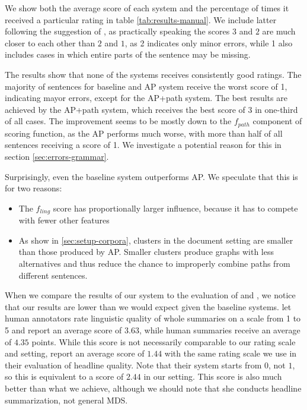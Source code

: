 \documentclass[a4paper,BCOR=10mm]{report}
\numberwithin{lemma}{chapter}
\numberwithin{definition}{chapter}
\begin{document}
We show both the average score of each system and the percentage of times it received a particular rating in table \ref{tab:results-manual}.
We include latter following the suggestion of \citet{filippova}, as practically speaking the scores $3$ and $2$ are much closer to each other than $2$ and $1$, as 2 indicates only minor errors, while 1 also includes cases in which entire parts of the sentence may be missing.

The results show that none of the systems receives consistently good ratings. The majority of sentences for baseline and AP system receive the worst score of 1, indicating mayor errors, except for the AP+path system.
The best results are achieved by the AP+path system, which receives the best score of 3 in one-third of all cases. The improvement seems to be mostly down to the $f_{path}$ component of scoring function, as the AP performs much worse, with more than half of all sentences receiving a score of 1.
We investigate a potential reason for this in section \ref{sec:errors-grammar}.

Surprisingly, even the baseline system outperforms AP. We speculate that this is for two reasons:

\begin{itemize}
    \item{The $f_{ling}$ score has proportionally larger influence, because it has to compete with fewer other features}
    \item{As show in \ref{sec:setup-corpora}, clusters in the document setting are smaller than those produced by AP. Smaller clusters produce graphs with less alternatives and thus reduce the chance to improperly combine paths from different sentences.}
\end{itemize}

When we compare the results of our system to the evaluation of \citet{banerjee} and \citet{filippova}, we notice that our results are lower than we would expect given the baseline systems. \citet{banerjee} let human annotators rate linguistic quality of whole summaries on a scale from 1 to 5 and report an average score of $3.63$, while human summaries receive an average of $4.35$ points.
While this score is not necessarily comparable to our rating scale and setting, \citet{filippova} report an average score of $1.44$ with the same rating scale we use in their evaluation of headline quality. Note that their system starts from $0$, not $1$, so this is equivalent to a score of $2.44$ in our setting. This score is also much better than what we achieve, although we should note that she conducts headline summarization, not general MDS.
\end{document}
